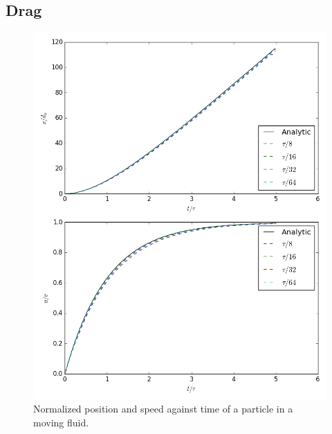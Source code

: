\documentclass[10pt,a4paper,titlepage]{report}
\begin{document}
\subsection{Drag}
\begin{figure}[!htb]
\centering
\includegraphics[scale=0.5]{figures/opencl_verification/drag_verification.png}
\caption{Normalized position and speed against time of a particle in a moving fluid.}
\label{fig:python_drag_verification}
\end{figure}
\end{document}
